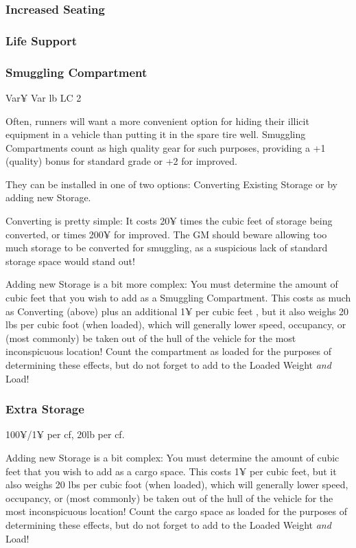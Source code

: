 \begin{multicols*}{2}
	\subsubsection{Increased Seating}
	
	
	\subsubsection{Life Support}
	
	
	\subsubsection{Smuggling Compartment}
	Var¥ Var lb LC 2
	
	Often, runners will want a more convenient option for hiding their illicit equipment in a vehicle than putting it in the spare tire well. Smuggling Compartments count as high quality gear for such purposes, providing a +1 (quality) bonus for standard grade or +2 for improved.
	
	They can be installed in one of two options: Converting Existing Storage or by adding new Storage.
	
	Converting is pretty simple: It costs 20¥ times the cubic feet of storage being converted, or times 200¥ for improved. The GM should beware allowing too much storage to be converted for smuggling, as a suspicious lack of standard storage space would stand out!
	
	Adding new Storage is a bit more complex: You must determine the amount of cubic feet that you wish to add as a Smuggling Compartment. This costs as much as Converting (above) plus an additional 1¥ per cubic feet , but it also weighs 20 lbs per cubic foot (when loaded), which will generally lower speed, occupancy, or (most commonly) be taken out of the hull of the vehicle for the most inconspicuous location! Count the compartment as loaded for the purposes of determining these effects, but do not forget to add to the Loaded Weight \textit{and} Load!
	
	\subsubsection{Extra Storage}
	100¥/1¥ per cf, 20lb per cf.
	
	Adding new Storage is a bit complex: You must determine the amount of cubic feet that you wish to add as a cargo space. This costs 1¥ per cubic feet, but it also weighs 20 lbs per cubic foot (when loaded), which will generally lower speed, occupancy, or (most commonly) be taken out of the hull of the vehicle for the most inconspicuous location! Count the cargo space as loaded for the purposes of determining these effects, but do not forget to add to the Loaded Weight \textit{and} Load!
	

\end{multicols*}
